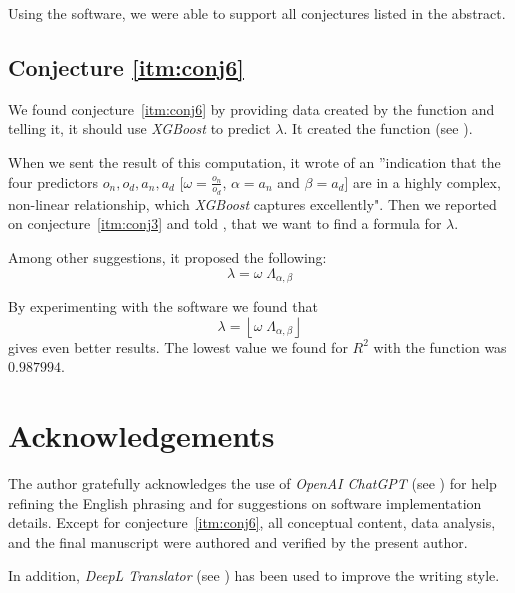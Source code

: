 \documentclass[11pt]{article}
\theoremstyle{remark}
\begin{document}
Using the \langc software, we were able to support all conjectures listed in the abstract.

\subsection{Conjecture \ref{itm:conj6}}

We found conjecture~\ref{itm:conj6} by providing \chat data created by the \langc function  and telling it, it should use \emph{XGBoost} to predict $\lambda$. It created the \langp function  (see \cite{Kunert2025}). 

When we sent \chat the result of this computation, it wrote of an ”indication that the four predictors \(o_n, o_d, a_n, a_d\) [$\omega = \frac{o_n}{o_d}$, $\alpha = a_n$ and $\beta = a_d$] are in a highly complex, non-linear relationship, which \emph{XGBoost} captures excellently". Then we reported on conjecture~\ref{itm:conj3} and told \chat, that we want to find a formula for $\lambda$.

Among other suggestions, it proposed the following:
%
\begin{equation}
\lambda = \omega \; \Lambda_{\alpha, \beta}
\end{equation}

By experimenting with the \langc software we found that
%
\begin{equation}
\lambda = \left\lfloor \omega \; \Lambda_{\alpha, \beta} \right\rfloor
\end{equation}
%
gives even better results. The lowest value we found for $R^2$ with the \langc function  was $0.987994$.

\section*{Acknowledgements}

The author gratefully acknowledges the use of \emph{OpenAI ChatGPT} (see \cite{ChatGPT}) for help refining the English phrasing and for suggestions on software implementation details. Except for conjecture~\ref{itm:conj6}, all conceptual content, data analysis, and the final manuscript were authored and verified by the present author.

In addition, \emph{DeepL Translator} (see \cite{DeepL}) has been used to improve the writing style.
\end{document}
